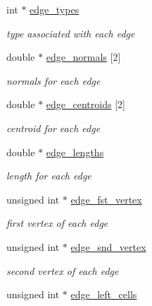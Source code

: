 \begin{DoxyCompactItemize}
int $\ast$ \hyperlink{structFVL_1_1CFVMesh2D_1_1CFVMesh2D__cuda_a6a62f4029cdd76f0ca586851d6eaf684}{edge\_\-types}
\begin{DoxyCompactList}\small\item\em type associated with each edge \item\end{DoxyCompactList}\item 
double $\ast$ \hyperlink{structFVL_1_1CFVMesh2D_1_1CFVMesh2D__cuda_ae49cff6bcafed1edb776bf5104de51d1}{edge\_\-normals} \mbox{[}2\mbox{]}
\begin{DoxyCompactList}\small\item\em normals for each edge \item\end{DoxyCompactList}\item 
double $\ast$ \hyperlink{structFVL_1_1CFVMesh2D_1_1CFVMesh2D__cuda_aff4d73402091e4860e902f3f7f66a06c}{edge\_\-centroids} \mbox{[}2\mbox{]}
\begin{DoxyCompactList}\small\item\em centroid for each edge \item\end{DoxyCompactList}\item 
double $\ast$ \hyperlink{structFVL_1_1CFVMesh2D_1_1CFVMesh2D__cuda_ad9e8d94c7c782f032f8320f7d5ee618b}{edge\_\-lengths}
\begin{DoxyCompactList}\small\item\em length for each edge \item\end{DoxyCompactList}\item 
unsigned int $\ast$ \hyperlink{structFVL_1_1CFVMesh2D_1_1CFVMesh2D__cuda_a541be23cac3c920c96257391179a196c}{edge\_\-fst\_\-vertex}
\begin{DoxyCompactList}\small\item\em first vertex of each edge \item\end{DoxyCompactList}\item 
unsigned int $\ast$ \hyperlink{structFVL_1_1CFVMesh2D_1_1CFVMesh2D__cuda_a656712266e15816d723aae1c64411c52}{edge\_\-snd\_\-vertex}
\begin{DoxyCompactList}\small\item\em second vertex of each edge \item\end{DoxyCompactList}\item 
unsigned int $\ast$ \hyperlink{structFVL_1_1CFVMesh2D_1_1CFVMesh2D__cuda_aa06063ffa67470f21a645851175bf1f6}{edge\_\-left\_\-cells}

\end{DoxyCompactItemize}
